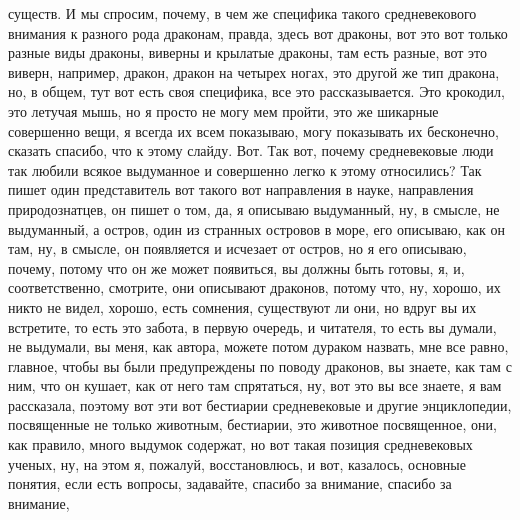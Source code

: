 существ. И мы спросим, почему, в чем же специфика такого средневекового внимания
к разного рода драконам, правда, здесь вот драконы, вот это вот только разные
виды драконы, виверны и крылатые драконы, там есть разные, вот это виверн,
например, дракон, дракон на четырех ногах, это другой же тип дракона, но, в
общем, тут вот есть своя специфика, все это рассказывается. Это крокодил, это
летучая мышь, но я просто не могу мем пройти, это же шикарные совершенно вещи, я
всегда их всем показываю, могу показывать их бесконечно, сказать спасибо, что к
этому слайду. Вот. Так вот, почему средневековые люди так любили всякое
выдуманное и совершенно легко к этому относились? Так пишет один представитель
вот такого вот направления в науке, направления природознатцев, он пишет о том,
да, я описываю выдуманный, ну, в смысле, не выдуманный, а остров, один из
странных островов в море, его описываю, как он там, ну, в смысле, он появляется
и исчезает от остров, но я его описываю, почему, потому что он же может
появиться, вы должны быть готовы, я, и, соответственно, смотрите, они описывают
драконов, потому что, ну, хорошо, их никто не видел, хорошо, есть сомнения,
существуют ли они, но вдруг вы их встретите, то есть это забота, в первую
очередь, и читателя, то есть вы думали, не выдумали, вы меня, как автора, можете
потом дураком назвать, мне все равно, главное, чтобы вы были предупреждены по
поводу драконов, вы знаете, как там с ним, что он кушает, как от него там
спрятаться, ну, вот это вы все знаете, я вам рассказала, поэтому вот эти вот
бестиарии средневековые и другие энциклопедии, посвященные не только животным,
бестиарии, это животное посвященное, они, как правило, много выдумок содержат,
но вот такая позиция средневековых ученых, ну, на этом я, пожалуй,
восстановлюсь, и вот, казалось, основные понятия, если есть вопросы, задавайте,
спасибо за внимание, спасибо за внимание,
